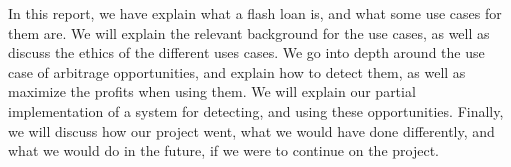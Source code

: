 In this report, we have explain what a flash loan is, and what some use cases
for them are. We will explain the relevant background for the use cases, as well
as discuss the ethics of the different uses cases. We go into depth around the
use case of arbitrage opportunities, and explain how to detect them, as well as
maximize the profits when using them. We will explain our partial implementation
of a system for detecting, and using these opportunities. Finally, we will
discuss how our project went, what we would have done differently, and what we
would do in the future, if we were to continue on the project.
